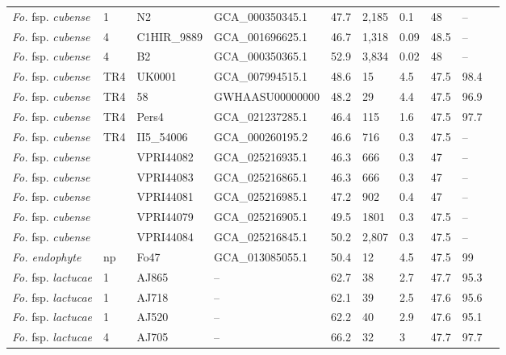 \begin{ThreePartTable}
\begin{longtable}[c]{@{}C{2.5cm}C{0.8cm}C{2cm}C{2.2cm}C{1.5cm}C{1.5cm}C{1.5cm}C{0.9cm}C{1.8cm}C{1.8cm}@{}}
\textit{Fo.} fsp. \textit{cubense}      & 1   & N2           & GCA\_000350345.1 & 47.7 & 2,185 & 0.1  & 48   &--    \\
\textit{Fo.} fsp. \textit{cubense}      & 4   & C1HIR\_9889  & GCA\_001696625.1 & 46.7 & 1,318 & 0.09 & 48.5 &--    \\
\textit{Fo.} fsp. \textit{cubense}      & 4   & B2           & GCA\_000350365.1 & 52.9 & 3,834 & 0.02 & 48   &--    \\
\textit{Fo.} fsp. \textit{cubense}      & TR4 & UK0001       & GCA\_007994515.1 & 48.6 & 15    & 4.5  & 47.5 & 98.4 \\
\textit{Fo.} fsp. \textit{cubense}      & TR4 & 58           & GWHAASU00000000  & 48.2 & 29    & 4.4  & 47.5 & 96.9 \\
\textit{Fo.} fsp. \textit{cubense}      & TR4 & Pers4        & GCA\_021237285.1 & 46.4 & 115   & 1.6  & 47.5 & 97.7 \\
\textit{Fo.} fsp. \textit{cubense}      & TR4 & II5\_54006   & GCA\_000260195.2 & 46.6 & 716   & 0.3  & 47.5 &--    \\
\textit{Fo.} fsp. \textit{cubense}      &     & VPRI44082    & GCA\_025216935.1 & 46.3 & 666   & 0.3  & 47   &--    \\
\textit{Fo.} fsp. \textit{cubense}      &     & VPRI44083    & GCA\_025216865.1 & 46.3 & 666   & 0.3  & 47   &--    \\
\textit{Fo.} fsp. \textit{cubense}      &     & VPRI44081    & GCA\_025216985.1 & 47.2 & 902   & 0.4  & 47   &--    \\
\textit{Fo.} fsp. \textit{cubense}      &     & VPRI44079    & GCA\_025216905.1 & 49.5 & 1801  & 0.3  & 47.5 &--    \\
\textit{Fo.} fsp. \textit{cubense}      &     & VPRI44084    & GCA\_025216845.1 & 50.2 & 2,807 & 0.3  & 47.5 &--    \\
\textit{Fo. endophyte}         & np  & Fo47         & GCA\_013085055.1 & 50.4 & 12    & 4.5  & 47.5 & 99   \\
\textit{Fo.} fsp. \textit{lactucae}     & 1   & AJ865        &--             & 62.7 & 38    & 2.7  & 47.7 & 95.3 \\
\textit{Fo.} fsp. \textit{lactucae}     & 1   & AJ718        &--             & 62.1 & 39    & 2.5  & 47.6 & 95.6 \\
\textit{Fo.} fsp. \textit{lactucae}     & 1   & AJ520        &--             & 62.2 & 40    & 2.9  & 47.6 & 95.1 \\
\textit{Fo.} fsp. \textit{lactucae}     & 4   & AJ705        &--             & 66.2 & 32    & 3    & 47.7 & 97.7 \\

\end{longtable}
\end{ThreePartTable}
